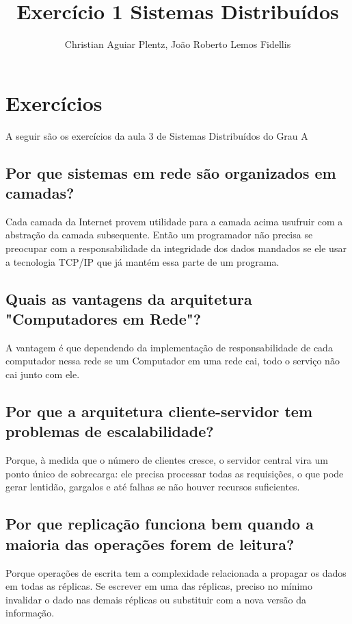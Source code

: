 \documentclass[12pt]{article}
\title{Exercício 1 Sistemas Distribuídos}
\author{Christian Aguiar Plentz\inst{1}, João Roberto Lemos Fidellis\inst{2} }
\begin{document}
 

\maketitle

\section{Exercícios} \label{sec:exercicios}

A seguir são os exercícios da aula 3 de Sistemas Distribuídos do Grau A

\subsection{Por que sistemas em rede são organizados em camadas?}

Cada camada da Internet provem utilidade para a camada acima usufruir com a abstração
da camada subsequente. Então um programador não precisa se preocupar com a responsabilidade
da integridade dos dados mandados se ele usar a tecnologia TCP/IP que já mantém essa parte
de um programa.

\subsection{Quais as vantagens da arquitetura "Computadores em Rede"?} 

A vantagem é que dependendo da implementação de responsabilidade de cada computador nessa rede
se um Computador em uma rede cai, todo o serviço não cai junto com ele.

\subsection{Por que a arquitetura cliente-servidor tem problemas de escalabilidade?}

Porque, à medida que o número de clientes cresce, o servidor central vira um ponto único de sobrecarga: ele precisa processar todas as requisições, o que pode gerar lentidão, gargalos e até falhas se não houver recursos suficientes.

\subsection{Por que replicação funciona bem quando a maioria das operações forem de leitura?} 

Porque operações de escrita tem a complexidade relacionada a propagar os dados em todas as réplicas. Se escrever em uma das réplicas, preciso no mínimo invalidar o dado nas demais réplicas ou substituir com a nova versão da informação.
\end{document}
